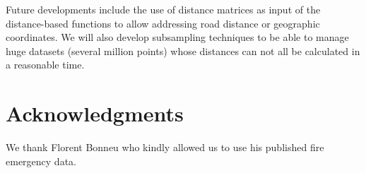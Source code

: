 \documentclass[nojss]{jss}
\begin{document}
Future developments include the use of distance matrices as input of the distance-based functions to allow addressing road distance or geographic coordinates. We will also develop subsampling techniques to be able to manage huge datasets (several million points) whose distances can not all be calculated in a reasonable time.


\section{Acknowledgments}

We thank Florent Bonneu who kindly allowed us to use his published fire emergency data.


\end{document}
